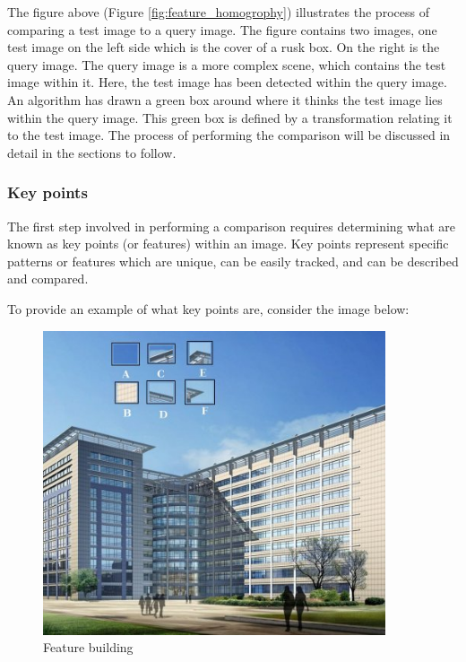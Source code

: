 \documentclass[11pt,a4paper]{report}
\begin{document}
				The figure above (Figure \ref{fig:feature_homogrophy}) illustrates the process of comparing a test image to a query image. The figure contains two images, one test image on the left side which is the cover of a rusk box. On the right is the query image. The query image is a more complex scene, which contains the test image within it. Here, the test image has been detected within the query image. An algorithm has drawn a green box around where it thinks the test image lies within the query image. This green box is defined by a transformation relating it to the test image. The process of performing the comparison will be discussed in detail in the sections to follow.
			
			\subsubsection{Key points}
				The first step involved in performing a comparison requires determining what are known as key points (or features) within an image. Key points represent specific patterns or features which are unique, can be easily tracked, and can be described and compared.
				
				To provide an example of what key points are, consider the image below:
				
				\begin{figure}[H]
					\centering
					\includegraphics[width=0.9\textwidth]{feature_building}
					\caption{Feature building}
					\label{fig:feature_building}
				\end{figure}
				
\end{document}
